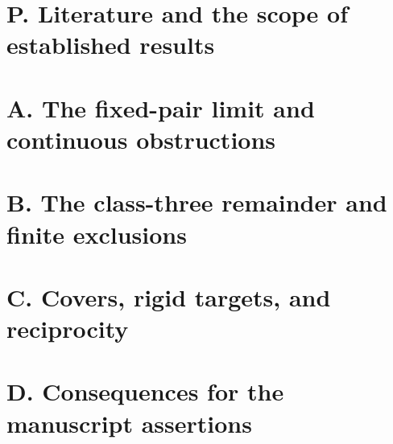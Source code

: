 \documentclass[11pt,a4paper]{article}
\begin{document}
\section{P. Literature and the scope of established results}




\section{A. The fixed-pair limit and continuous obstructions}





\section{B. The class-three remainder and finite exclusions}



\section{C. Covers, rigid targets, and reciprocity}

\section{D. Consequences for the manuscript assertions}

\end{document}

